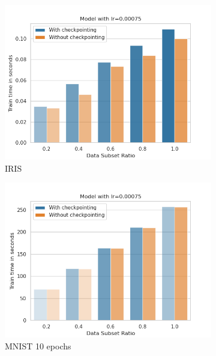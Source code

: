 \begin{figure}[h]
    \centering
    \begin{subfigure}[b]{0.24\textwidth}
        \centering
        \includegraphics[width=\textwidth]{figures/22_07/iris/train_subset_0.00075.png}
        \caption{IRIS}
        \label{fig:19a}
    \end{subfigure}
    \begin{subfigure}[b]{0.24\textwidth}
        \centering
        \includegraphics[width=\textwidth]{figures/22_07/10ep/train_subset_0.00075.png}
        \caption{MNIST 10 epochs}
        \label{fig:19b}
    \end{subfigure}
    \begin{subfigure}[b]{0.24\textwidth}

\end{subfigure}
\end{figure}

